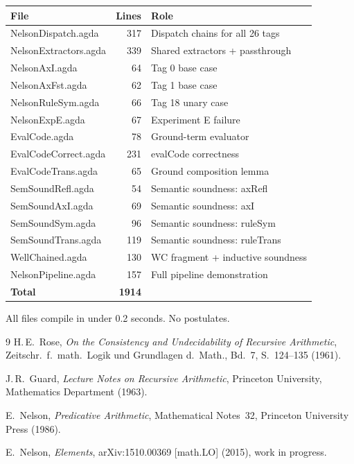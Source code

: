 \documentclass[11pt]{article}
\begin{document}
\begin{center}
\begin{tabular}{lrl}
\hline
\textbf{File} & \textbf{Lines} & \textbf{Role} \\
\hline
NelsonDispatch.agda & 317 & Dispatch chains for all 26 tags \\
NelsonExtractors.agda & 339 & Shared extractors + passthrough \\
NelsonAxI.agda & 64 & Tag 0 base case \\
NelsonAxFst.agda & 62 & Tag 1 base case \\
NelsonRuleSym.agda & 66 & Tag 18 unary case \\
NelsonExpE.agda & 67 & Experiment E failure \\
EvalCode.agda & 78 & Ground-term evaluator \\
EvalCodeCorrect.agda & 231 & evalCode correctness \\
EvalCodeTrans.agda & 65 & Ground composition lemma \\
SemSoundRefl.agda & 54 & Semantic soundness: axRefl \\
SemSoundAxI.agda & 69 & Semantic soundness: axI \\
SemSoundSym.agda & 96 & Semantic soundness: ruleSym \\
SemSoundTrans.agda & 119 & Semantic soundness: ruleTrans \\
WellChained.agda & 130 & WC fragment + inductive soundness \\
NelsonPipeline.agda & 157 & Full pipeline demonstration \\
\hline
\textbf{Total} & \textbf{1914} & \\
\hline
\end{tabular}
\end{center}

All files compile in under 0.2 seconds. No postulates.

\begin{thebibliography}{9}
 H.\,E.\ Rose,
\emph{On the Consistency and Undecidability of Recursive Arithmetic},
Zeitschr.\ f.\ math.\ Logik und Grundlagen d.\ Math., Bd.~7,
S.~124--135 (1961).

 J.\,R.\ Guard,
\emph{Lecture Notes on Recursive Arithmetic},
Princeton University, Mathematics Department (1963).

 E.\ Nelson,
\emph{Predicative Arithmetic},
Mathematical Notes~32, Princeton University Press (1986).

 E.\ Nelson,
\emph{Elements},
arXiv:1510.00369 [math.LO] (2015), work in progress.
\end{thebibliography}
\end{document}
